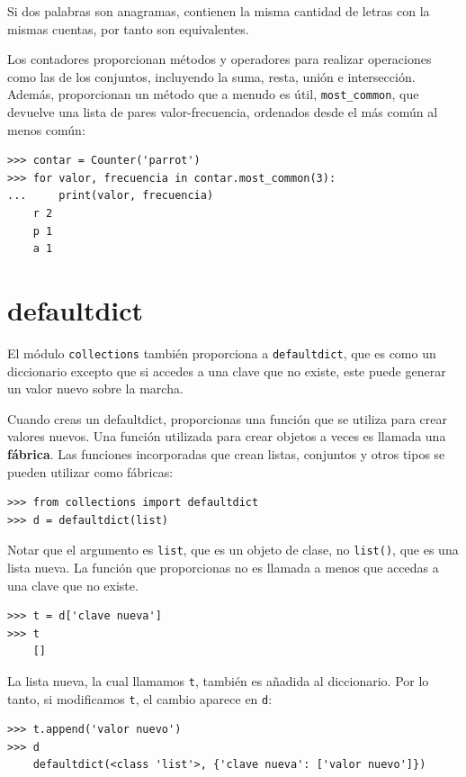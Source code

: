 \documentclass[10pt]{book}
\begin{document}
Si dos palabras son anagramas, contienen la misma cantidad de letras con la mismas
cuentas, por tanto son equivalentes.

Los contadores proporcionan métodos y operadores para realizar operaciones como las de los conjuntos,
incluyendo la suma, resta, unión e intersección.  Además,
proporcionan un método que a menudo es útil, \verb"most_common", que
devuelve una lista de pares valor-frecuencia, ordenados desde el más común al
menos común:

\begin{verbatim}
>>> contar = Counter('parrot')
>>> for valor, frecuencia in contar.most_common(3):
...     print(valor, frecuencia)
    r 2
    p 1
    a 1
\end{verbatim}


\section{defaultdict}

El módulo {\tt collections} también proporciona a {\tt defaultdict}, que es
como un diccionario excepto que si accedes a una clave que no existe,
este puede generar un valor nuevo sobre la marcha.

Cuando creas un defaultdict, proporcionas una función que se utiliza para
crear valores nuevos.  Una función utilizada para crear objetos a veces es
llamada una {\bf fábrica}.  Las funciones incorporadas que crean listas, conjuntos
y otros tipos se pueden utilizar como fábricas:

\begin{verbatim}
>>> from collections import defaultdict
>>> d = defaultdict(list)
\end{verbatim}

Notar que el argumento es {\tt list}, que es un objeto de clase,
no {\tt list()}, que es una lista nueva.  La función que proporcionas
no es llamada a menos que accedas a una clave que no existe.

\begin{verbatim}
>>> t = d['clave nueva']
>>> t
    []
\end{verbatim}

La lista nueva, la cual llamamos {\tt t}, también es añadida al
diccionario.  Por lo tanto, si modificamos {\tt t}, el cambio aparece en {\tt d}:

\begin{verbatim}
>>> t.append('valor nuevo')
>>> d
    defaultdict(<class 'list'>, {'clave nueva': ['valor nuevo']})
\end{verbatim}
\end{document}
